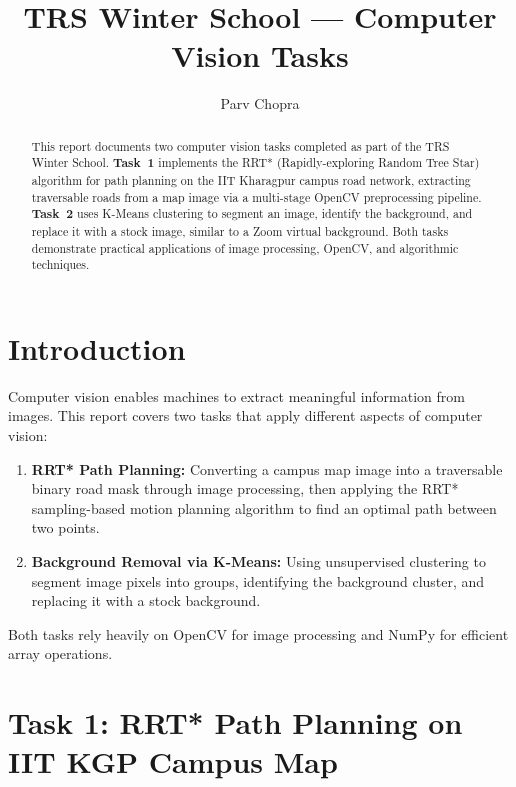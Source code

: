 \documentclass[conference,twocolumn]{IEEEtran}
\title{TRS Winter School — Computer Vision Tasks}
\author{Parv Chopra}
\begin{document}
\maketitle

\begin{abstract}
This report documents two computer vision tasks completed as part of the TRS Winter School. \textbf{Task~1} implements the RRT* (Rapidly-exploring Random Tree Star) algorithm for path planning on the IIT Kharagpur campus road network, extracting traversable roads from a map image via a multi-stage OpenCV preprocessing pipeline. \textbf{Task~2} uses K-Means clustering to segment an image, identify the background, and replace it with a stock image, similar to a Zoom virtual background. Both tasks demonstrate practical applications of image processing, OpenCV, and algorithmic techniques.
\end{abstract}

\section{Introduction}

Computer vision enables machines to extract meaningful information from images. This report covers two tasks that apply different aspects of computer vision:

\begin{enumerate}
    \item \textbf{RRT* Path Planning:} Converting a campus map image into a traversable binary road mask through image processing, then applying the RRT* sampling-based motion planning algorithm to find an optimal path between two points.
    \item \textbf{Background Removal via K-Means:} Using unsupervised clustering to segment image pixels into groups, identifying the background cluster, and replacing it with a stock background.
\end{enumerate}

Both tasks rely heavily on OpenCV for image processing and NumPy for efficient array operations.

\section{Task 1: RRT* Path Planning on IIT KGP Campus Map}
\end{document}
